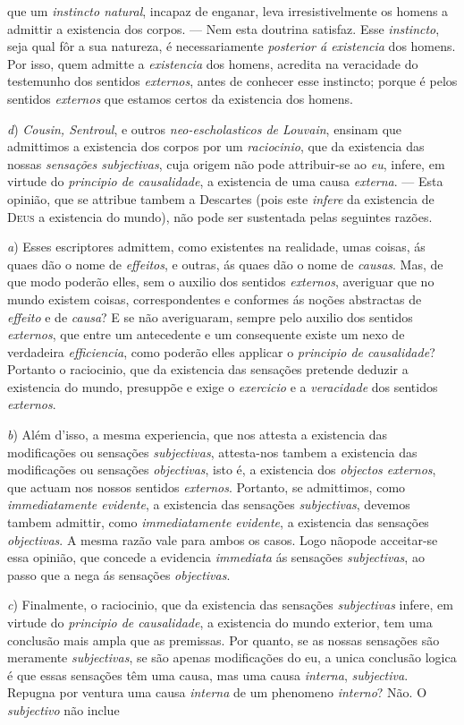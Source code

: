 que um \emph{instincto natural}, incapaz de enganar, leva irresistivelmente os homens a admittir a existencia dos corpos. --- Nem esta doutrina satisfaz. Esse \emph{instincto}, seja qual fôr a sua natureza, é necessariamente \emph{posterior á existencia} dos homens. Por isso, quem admitte a \emph{existencia} dos homens, acredita na veracidade do testemunho dos sentidos \emph{externos}, antes de conhecer esse instincto; porque é pelos sentidos \emph{externos} que estamos certos da existencia dos homens.\par \emph{d}) \emph{Cousin, Sentroul}, e outros \emph{neo-escholasticos de Louvain}, ensinam que admittimos a existencia dos corpos por um \emph{raciocinio}, que da existencia das nossas \emph{sensações subjectivas}, cuja origem não pode attribuir-se ao \emph{eu}, infere, em virtude do \emph{principio de causalidade}, a existencia de uma causa \emph{externa}. --- Esta opinião, que se attribue tambem a Descartes (pois este \emph{infere} da existencia de \textsc{Deus} a existencia do mundo), não pode ser sustentada pelas seguintes razões.\par \emph{a}) Esses escriptores admittem, como existentes na realidade, umas coisas, ás quaes dão o nome de \emph{effeitos}, e outras, ás quaes dão o nome de \emph{causas}. Mas, de que modo poderão elles, sem o auxilio dos sentidos \emph{externos}, averiguar que no mundo existem coisas, correspondentes e conformes ás noções abstractas de \emph{effeito} e de \emph{causa}? E se não averiguaram, sempre pelo auxilio dos sentidos \emph{externos}, que entre um antecedente e um consequente existe um nexo de verdadeira \emph{efficiencia}, como poderão elles applicar o \emph{principio de causalidade}? Portanto o raciocinio, que da existencia das sensações pretende deduzir a existencia do mundo, presuppõe e exige o \emph{exercicio} e a \emph{veracidade} dos sentidos \emph{externos}.\par \emph{b}) Além d'isso, a mesma experiencia, que nos attesta a existencia das modificações ou sensações \emph{subjectivas}, attesta-nos tambem a existencia das modificações ou sensações \emph{objectivas}, isto é, a existencia dos \emph{objectos externos}, que actuam nos nossos sentidos \emph{externos}. Portanto, se admittimos, como \emph{immediatamente evidente}, a existencia das sensações \emph{subjectivas}, devemos tambem admittir, como \emph{immediatamente evidente}, a existencia das sensações \emph{objectivas}. A mesma razão vale para ambos os casos. Logo nãopode acceitar-se essa opinião, que concede a evidencia \emph{immediata} ás sensações \emph{subjectivas}, ao passo que a nega ás sensações \emph{objectivas}.\par \emph{c}) Finalmente, o raciocinio, que da existencia das sensações \emph{subjectivas} infere, em virtude do \emph{principio de causalidade}, a existencia do mundo exterior, tem uma conclusão mais ampla que as premissas. Por quanto, se as nossas sensações são meramente \emph{subjectivas}, se são apenas modificações do eu, a unica conclusão logica é que essas sensações têm uma causa, mas uma causa \emph{interna}, \emph{subjectiva}. Repugna por ventura uma causa \emph{interna} de um phenomeno \emph{interno}? Não. O \emph{subjectivo} não inclue 
